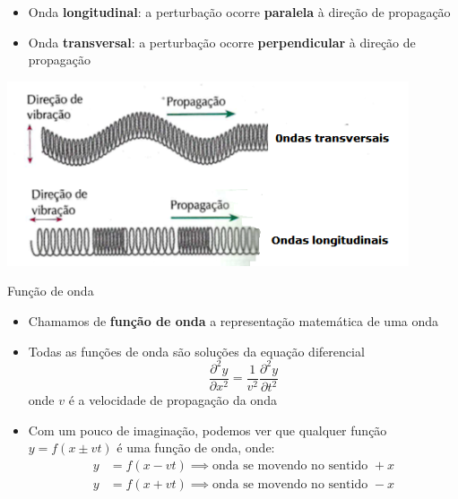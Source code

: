 \begin{frame}
    \begin{itemize}
        \item Onda \textbf{longitudinal}: a perturbação ocorre \textbf{paralela} à direção
            de propagação

        \item Onda \textbf{transversal}: a perturbação ocorre \textbf{perpendicular} à direção
            de propagação
    \end{itemize}

    \vspace{1cm}
    \centering
    \includegraphics[height=0.6\textheight]{images/onda_lon_tra.png}
\end{frame}

\begin{frame}{Função de onda}
    \begin{itemize}
        \item Chamamos de \textbf{função de onda} a representação matemática de uma onda
        \item Todas as funções de onda são soluções da equação diferencial
            \[
                \frac{\partial^2 y}{\partial x^2} = 
                \frac{1}{v^2} \frac{\partial^2 y}{\partial t^2}
            \]
            onde \(v\) é a velocidade de propagação da onda
        \item Com um pouco de imaginação, podemos ver que qualquer função
            \(y=f(x \pm vt)\) é uma função de onda, onde:
            \begin{align*}
                y&=f(x-vt) \implies \text{onda se movendo no sentido } +x \\
                y&=f(x+vt) \implies \text{onda se movendo no sentido } -x 
            \end{align*}
    \end{itemize}
\end{frame}

